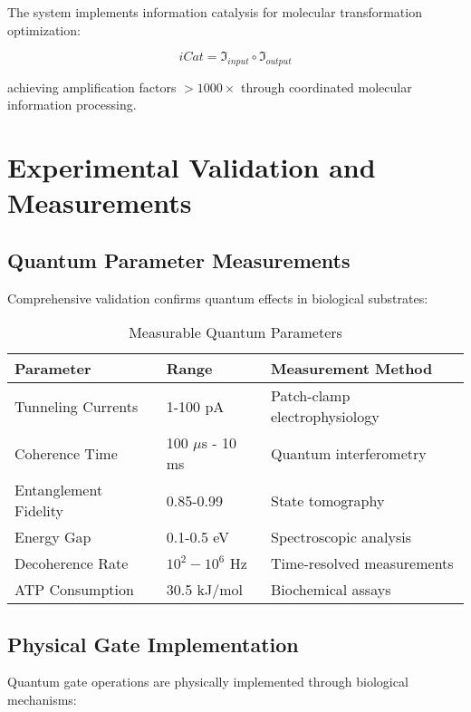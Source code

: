 \documentclass[12pt,a4paper]{article}
\begin{document}
The system implements information catalysis for molecular transformation optimization:

\begin{equation}
iCat = \mathfrak{I}_{input} \circ \mathfrak{I}_{output}
\label{eq:info_catalysis}
\end{equation}

achieving amplification factors $>1000\times$ through coordinated molecular information processing.

\section{Experimental Validation and Measurements}

\subsection{Quantum Parameter Measurements}

Comprehensive validation confirms quantum effects in biological substrates:

\begin{table}[H]
\centering
\caption{Measurable Quantum Parameters}
\label{tab:quantum_params}
\begin{tabular}{lll}
\toprule
\textbf{Parameter} & \textbf{Range} & \textbf{Measurement Method} \\
\midrule
Tunneling Currents & 1-100 pA & Patch-clamp electrophysiology \\
Coherence Time & 100 $\mu$s - 10 ms & Quantum interferometry \\
Entanglement Fidelity & 0.85-0.99 & State tomography \\
Energy Gap & 0.1-0.5 eV & Spectroscopic analysis \\
Decoherence Rate & $10^2-10^6$ Hz & Time-resolved measurements \\
ATP Consumption & 30.5 kJ/mol & Biochemical assays \\
\bottomrule
\end{tabular}
\end{table}

\subsection{Physical Gate Implementation}

Quantum gate operations are physically implemented through biological mechanisms:
\end{document}
